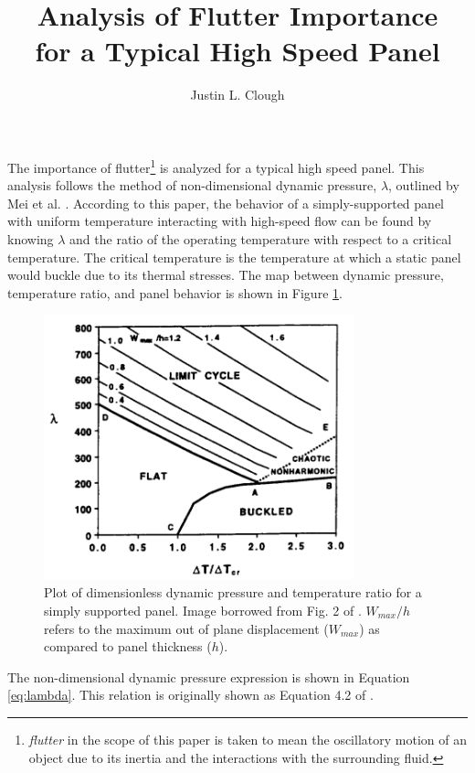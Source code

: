 \documentclass[a4paper, 12pt]{article}
\author{Justin L. Clough}
\title{Analysis of Flutter Importance \\ for a Typical High Speed Panel}
\begin{document}
\maketitle

The importance of flutter\footnote{\emph{flutter} in the scope of this paper
 is taken to mean the oscillatory motion of an object
 due to its inertia and the interactions with the 
 surrounding fluid.
 }
is analyzed for a typical high speed panel.
This analysis follows the method of non-dimensional dynamic pressure, $\lambda$, 
outlined by Mei et al. \cite{bib:nasa_paper_Mei}.
According to this paper, the behavior of a simply-supported panel with uniform temperature
interacting with high-speed flow can be found by knowing $\lambda$
and the ratio of the operating temperature with respect to a critical temperature.
The critical temperature is the temperature at which a static panel would buckle
due to its thermal stresses. 
The map between dynamic pressure, temperature ratio, and panel behavior is shown in
Figure \ref{fig:lambda_map}.

\begin{figure}[H]
  \centering
  \includegraphics[width=0.8\textwidth]{nasa_lambda_T_areas}
  \caption{Plot of dimensionless dynamic pressure and temperature ratio 
           for a simply supported panel. 
           Image borrowed from Fig. 2 of \cite{bib:nasa_paper_Mei}.
           $W_{max}/h$ refers to the maximum out of plane displacement ($W_{max}$)
           as compared to panel thickness ($h$).
          }
  \label{fig:lambda_map}
\end{figure}

\noindent
The non-dimensional dynamic pressure expression is shown in Equation \ref{eq:lambda}.
This relation is originally shown as Equation 4.2 of \cite{bib:nasa_paper_Mei}.
\end{document}
